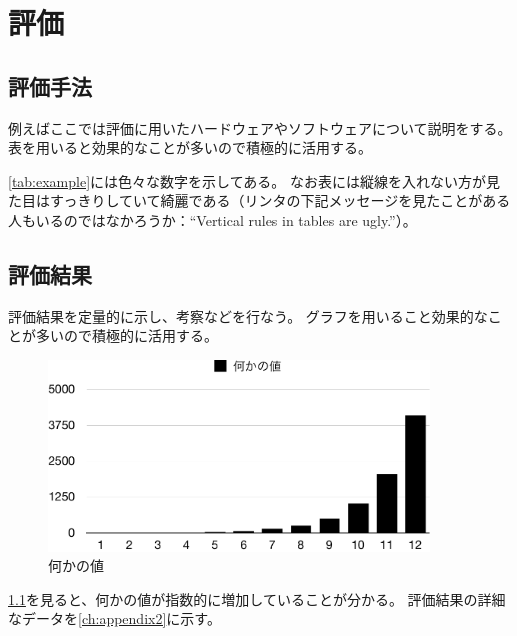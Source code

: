 \chapter{評価}\label{ch:evaluation}

\section{評価手法}\label{sec:methodology}

例えばここでは評価に用いたハードウェアやソフトウェアについて説明をする。
表を用いると効果的なことが多いので積極的に活用する。

\begin{table}[ht]
  \centering
  \caption{数字が色々書いてある表}{
}
\end{table}

\cref{tab:example}には色々な数字を示してある。
なお表には縦線を入れない方が見た目はすっきりしていて綺麗である（リンタの下記メッセージを見たことがある人もいるのではなかろうか：``Vertical rules in tables are ugly.''）。

\section{評価結果}\label{sec:results}

評価結果を定量的に示し、考察などを行なう。
グラフを用いること効果的なことが多いので積極的に活用する。

\begin{figure}[ht]
  \centering
  \includegraphics[width=0.9\textwidth]{examples/graphs/example}
  \caption{何かの値}\label{fig:example}
\end{figure}

\cref{fig:example}を見ると、何かの値が指数的に増加していることが分かる。
評価結果の詳細なデータを\cref{ch:appendix2}に示す。